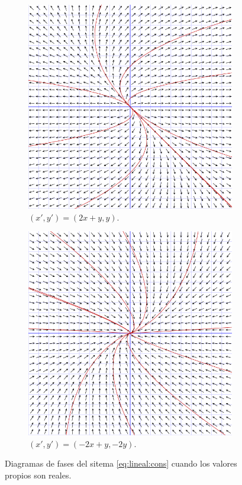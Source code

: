 \begin{enumerate}
\begin{figure}[H]
\begin{subfigure}{.45\textwidth}
      \includegraphics[width=.8\textwidth]{./images/fases-pos-pos.png}
      \caption{$(x', y') = (2x +y, y)$.}
      \label{fig:fases:pos-pos}
    \end{subfigure}
    \begin{subfigure}{.45\textwidth}
      \centering
      \includegraphics[width=.8\textwidth]{./images/fases-neg-eq.png}
      \caption{$(x', y') = (-2x +y, -2y)$.}
      \label{fig:fases:neg-eq}
    \end{subfigure}
    \caption{Diagramas de fases del sitema \eqref{eq:lineal:cons} cuando los valores propios son
      reales.}
  \end{figure}


\end{enumerate}

